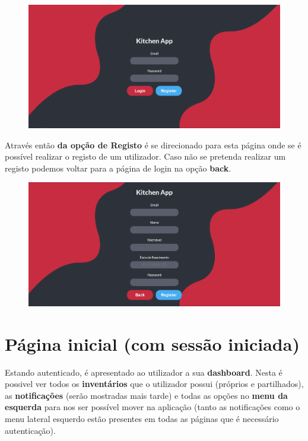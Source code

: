 \documentclass[a4paper]{report}
\begin{document}
    \begin{figure}[H]
        \centering
            \includegraphics[width=\textwidth]{images/produto_final/login.png}
    \end{figure}

    Através então \textbf{da opção de Registo} é se direcionado para esta 
    página onde se é possível realizar o registo de um utilizador. Caso 
    não se pretenda realizar um registo podemos voltar para a página de login
    na opção \textbf{back}.

    \begin{figure}[H]
        \centering
            \includegraphics[width=\textwidth]{images/produto_final/registo.png}
    \end{figure}

    \section{Página inicial (com sessão iniciada)}

    Estando autenticado, é apresentado ao utilizador a sua \textbf{dashboard}.
    Nesta é possivel ver todos os \textbf{inventários} que o utilizador possui
    (próprios e partilhados), as \textbf{notificações} (serão mostradas mais 
    tarde) e todas as opções no \textbf{menu da esquerda} para nos ser 
    possível mover na aplicação (tanto as notificações como o menu lateral 
    esquerdo estão presentes em todas as páginas que é necessário 
    autenticação).
\end{document}
